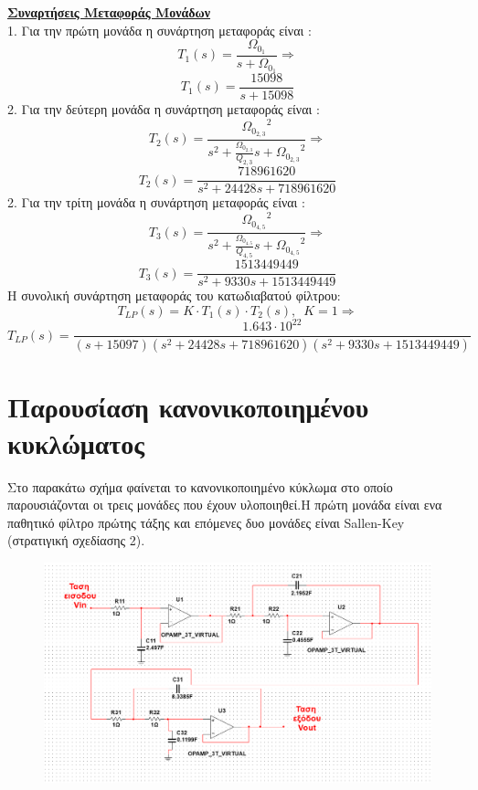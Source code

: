\documentclass{article}
\begin{document}
\large{ \underline{\textbf{Συναρτήσεις Μεταφοράς Μονάδων}} \\[0.4\baselineskip]
\large{}
1. Για την πρώτη μονάδα η συνάρτηση μεταφοράς είναι :
\begin{equation*}
T_1(s) = \frac{{Ω_{0_{1}}}}{s+Ω_{0_{1}}} \Rightarrow
\end{equation*}
 \begin{equation*}
\boxed{T_1(s) = \frac{15098}{s+15098} }
\end{equation*}
2. Για την δεύτερη μονάδα η συνάρτηση μεταφοράς είναι :
\begin{equation*}
T_2(s) = \frac{{Ω_{0_{2,3}}}^2}{s^2+ \frac{Ω_{0_{2,3}}}{Q_{2,3}}s+ {Ω_{0_{2,3}}}^2} \Rightarrow
\end{equation*}
\begin{equation*}
\boxed{T_2(s) = \frac{718961620}{s^2+24428s+718961620}}
\end{equation*}
2. Για την τρίτη μονάδα η συνάρτηση μεταφοράς είναι :
\begin{equation*}
T_3(s) = \frac{{Ω_{0_{4,5}}}^2}{s^2+ \frac{Ω_{0_{4,5}}}{Q_{4,5}}s+ {Ω_{0_{4,5}}}^2} \Rightarrow
\end{equation*}
\begin{equation*}
\boxed{T_3(s) = \frac{1513449449}{s^2+9330s+1513449449}}
\end{equation*}
Η συνολική συνάρτηση μεταφοράς του κατωδιαβατού φίλτρου:
\begin{equation*}
T_{LP}(s) = Κ \cdot T_1(s) \cdot T_2(s), \enspace K=1
 \Rightarrow
\end{equation*}
\begin{equation*}
\boxed{T_{LP}(s) = \frac{1.643 \cdot 10^{22}}{(s+15097)(s^2+24428s+718961620)(s^2+9330s+1513449449)}}
\end{equation*}
\newpage
\section*{Παρουσίαση κανονικοποιημένου κυκλώματος}
Στο παρακάτω σχήμα φαίνεται το κανονικοποιημένο κύκλωμα στο οποίο παρουσιάζονται οι τρεις μονάδες που έχουν υλοποιηθεί.Η πρώτη μονάδα είναι ενα παθητικό φίλτρο πρώτης τάξης και επόμενες δυο μονάδες είναι Sallen-Key (στρατιγική σχεδίασης 2).

 \begin{figure}[h!]
\centering
 	\advance\leftskip-4.9cm
  \includegraphics[width=220mm,scale=2]{kanonikopoiimeno_fixed.png}
  

\end{figure}}
\end{document}
